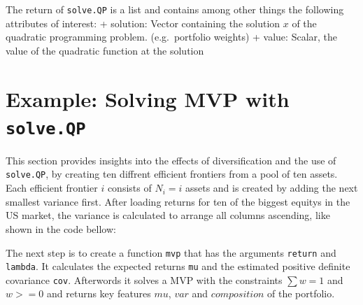 \documentclass[
  oneside]{book}
\newenvironment{Shaded}{\begin{snugshade}}{\end{snugshade}}
\newcommand{\AttributeTok}[1]{\textcolor[rgb]{0.77,0.63,0.00}{#1}}
\newcommand{\CommentTok}[1]{\textcolor[rgb]{0.56,0.35,0.01}{\textit{#1}}}
\newcommand{\FunctionTok}[1]{\textcolor[rgb]{0.00,0.00,0.00}{#1}}
\newcommand{\NormalTok}[1]{#1}
\newcommand{\OtherTok}[1]{\textcolor[rgb]{0.56,0.35,0.01}{#1}}
\newcommand{\SpecialCharTok}[1]{\textcolor[rgb]{0.00,0.00,0.00}{#1}}
\newcommand{\StringTok}[1]{\textcolor[rgb]{0.31,0.60,0.02}{#1}}
\begin{document}
The return of \texttt{solve.QP} is a list and contains among other things the following attributes of interest:
+ solution: Vector containing the solution \(x\) of the quadratic programming problem. (e.g.~portfolio weights)
+ value: Scalar, the value of the quadratic function at the solution

\hypertarget{example-solving-mvp-with-solve.qp}{%
\section{\texorpdfstring{Example: Solving MVP with \texttt{solve.QP}}{Example: Solving MVP with solve.QP}}\label{example-solving-mvp-with-solve.qp}}

This section provides insights into the effects of diversification and the use of \texttt{solve.QP}, by creating ten diffrent efficient frontiers from a pool of ten assets. Each efficient frontier \(i\) consists of \(N_i = i\) assets and is created by adding the next smallest variance first. After loading returns for ten of the biggest equitys in the US market, the variance is calculated to arrange all columns ascending, like shown in the code bellow:

\begin{Shaded}
\end{Shaded}

The next step is to create a function \texttt{mvp} that has the arguments \texttt{return} and \texttt{lambda}. It calculates the expected returns \texttt{mu} and the estimated positive definite covariance \texttt{cov}. Afterwords it solves a MVP with the constraints \(\sum w = 1\) and \(w>=0\) and returns key features \(mu\), \(var\) and \(composition\) of the portfolio.
\end{document}
